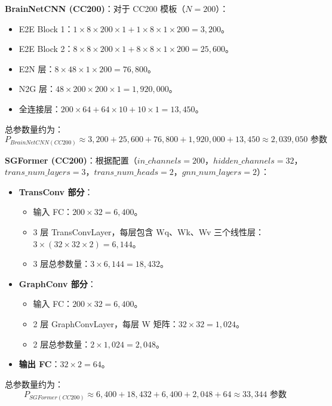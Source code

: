 \documentclass[12pt,a4paper]{article}
\begin{document}
\textbf{BrainNetCNN (CC200)}：对于 CC200 模板（$N=200$）：
\begin{itemize}
\item E2E Block 1：$1 \times 8 \times 200 \times 1 + 1 \times 8 \times 1 \times 200 = 3,200$。
\item E2E Block 2：$8 \times 8 \times 200 \times 1 + 8 \times 8 \times 1 \times 200 = 25,600$。
\item E2N 层：$8 \times 48 \times 1 \times 200 = 76,800$。
\item N2G 层：$48 \times 200 \times 200 \times 1 = 1,920,000$。
\item 全连接层：$200 \times 64 + 64 \times 10 + 10 \times 1 = 13,450$。
\end{itemize}
总参数量约为：
\begin{equation}
P_{BrainNetCNN(CC200)} \approx 3,200 + 25,600 + 76,800 + 1,920,000 + 13,450 \approx 2,039,050 \text{ 参数}
\end{equation}

\textbf{SGFormer (CC200)}：根据配置（$in\_channels=200$，$hidden\_channels=32$，$trans\_num\_layers=3$，$trans\_num\_heads=2$，$gnn\_num\_layers=2$）：
\begin{itemize}
\item \textbf{TransConv 部分}：
  \begin{itemize}
  \item 输入 FC：$200 \times 32 = 6,400$。
  \item 3 层 TransConvLayer，每层包含 Wq、Wk、Wv 三个线性层：$3 \times (32 \times 32 \times 2) = 6,144$。
  \item 3 层总参数量：$3 \times 6,144 = 18,432$。
  \end{itemize}
\item \textbf{GraphConv 部分}：
  \begin{itemize}
  \item 输入 FC：$200 \times 32 = 6,400$。
  \item 2 层 GraphConvLayer，每层 W 矩阵：$32 \times 32 = 1,024$。
  \item 2 层总参数量：$2 \times 1,024 = 2,048$。
  \end{itemize}
\item \textbf{输出 FC}：$32 \times 2 = 64$。
\end{itemize}
总参数量约为：
\begin{equation}
P_{SGFormer(CC200)} \approx 6,400 + 18,432 + 6,400 + 2,048 + 64 \approx 33,344 \text{ 参数}
\end{equation}
\end{document}
